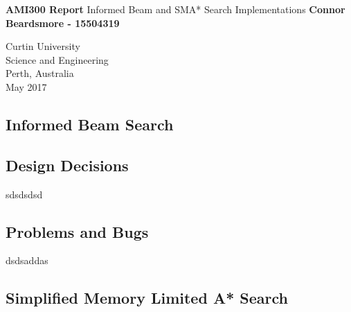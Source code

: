 \documentclass[]{article}
\begin{document}


	

\begin{titlepage}
	\begin{center}
		\vspace*{1cm}
		\LARGE\textbf{AMI300 Report} \vspace{0.5cm}
		\break
	    Informed Beam and SMA* Search Implementations
		\vspace{1cm}
		\break
		\Large\textbf{Connor Beardsmore - 15504319} 
		\vspace{15cm}

		\normalsize
		Curtin University \\
		Science and Engineering \\
		Perth, Australia \\
	    May 2017
	    
	\end{center}
\end{titlepage}


\vspace*{-0.8cm}
\begin{center}
	\section*{Informed Beam Search}
\end{center}

\vspace*{0.8cm}
\subsection*{Design Decisions}

sdsdsdsd

\vspace*{0.8cm}
\subsection*{Problems and Bugs}

dsdsaddas

\pagebreak

\begin{center}
	\section*{Simplified Memory Limited A* Search}
\end{center}
\end{document}
